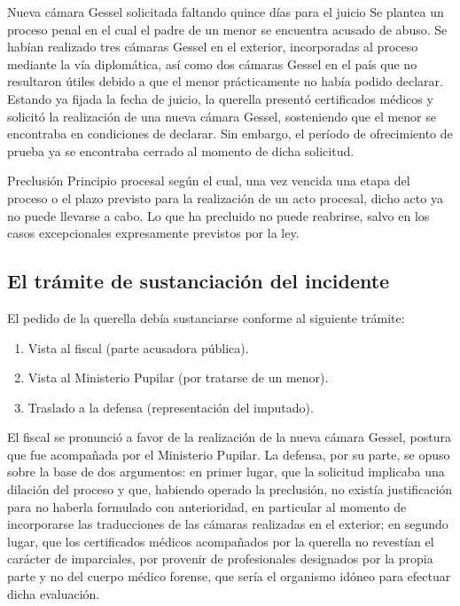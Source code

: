\documentclass[12pt,oneside]{book}
\begin{document}
\begin{example}{Nueva cámara Gessel solicitada faltando quince días para el juicio}
Se plantea un proceso penal en el cual el padre de un menor se encuentra acusado de abuso. Se habían realizado tres cámaras Gessel en el exterior, incorporadas al proceso mediante la vía diplomática, así como dos cámaras Gessel en el país que no resultaron útiles debido a que el menor prácticamente no había podido declarar. Estando ya fijada la fecha de juicio, la querella presentó certificados médicos y solicitó la realización de una nueva cámara Gessel, sosteniendo que el menor se encontraba en condiciones de declarar. Sin embargo, el período de ofrecimiento de prueba ya se encontraba cerrado al momento de dicha solicitud.
\end{example}

\begin{definition}{Preclusión}
Principio procesal según el cual, una vez vencida una etapa del proceso o el plazo previsto para la realización de un acto procesal, dicho acto ya no puede llevarse a cabo. Lo que ha precluido no puede reabrirse, salvo en los casos excepcionales expresamente previstos por la ley.
\end{definition}

\subsection{El trámite de sustanciación del incidente}

El pedido de la querella debía sustanciarse conforme al siguiente trámite:

\begin{enumerate}
    \item Vista al fiscal (parte acusadora pública).
    \item Vista al Ministerio Pupilar (por tratarse de un menor).
    \item Traslado a la defensa (representación del imputado).
\end{enumerate}

El fiscal se pronunció a favor de la realización de la nueva cámara Gessel, postura que fue acompañada por el Ministerio Pupilar. La defensa, por su parte, se opuso sobre la base de dos argumentos: en primer lugar, que la solicitud implicaba una dilación del proceso y que, habiendo operado la preclusión, no existía justificación para no haberla formulado con anterioridad, en particular al momento de incorporarse las traducciones de las cámaras realizadas en el exterior; en segundo lugar, que los certificados médicos acompañados por la querella no revestían el carácter de imparciales, por provenir de profesionales designados por la propia parte y no del cuerpo médico forense, que sería el organismo idóneo para efectuar dicha evaluación.
\end{document}
